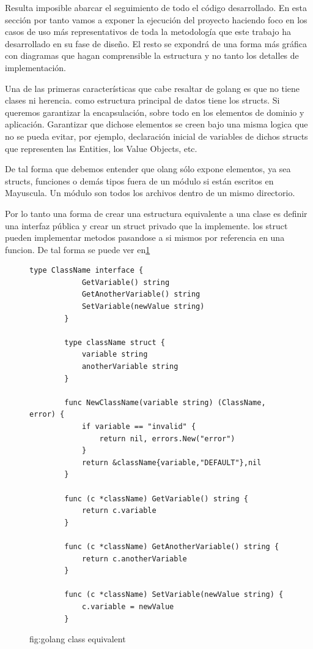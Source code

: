 Resulta imposible abarcar el seguimiento de todo el código desarrollado. En esta sección por tanto vamos a exponer la ejecución del proyecto haciendo foco en los casos de uso más representativos de toda la metodología que este trabajo ha desarrollado en su fase de diseño. El resto se expondrá de una forma más gráfica con diagramas que hagan comprensible la estructura y no tanto los detalles de implementación.

Una de las primeras características que cabe resaltar de golang es que no tiene clases ni herencia. como estructura
principal de datos tiene los structs. Si queremos garantizar la encapsulación, sobre todo en los elementos de dominio y aplicación. Garantizar que dichose elementos se creen bajo una misma logica que no se pueda evitar, por ejemplo, declaración inicial de variables de dichos structs que representen las Entities, los Value Objects, etc.

De tal forma que debemos entender que olang sólo expone elementos, ya sea structs, funciones o demás tipos fuera de un módulo si están escritos en Mayuscula. Un módulo son todos los archivos dentro de un mismo directorio.

Por lo tanto una forma de crear una estructura equivalente a una clase es definir una interfaz pública y crear un struct privado que la implemente. los struct pueden implementar metodos pasandose a si mismos por referencia en una funcion. De tal forma se puede ver en\ref{fig:golang class equivalent}

\begin{figure}[H]
    \centering
    \begin{lstlisting}[label={lst:lstlisting}]
        type ClassName interface {
            GetVariable() string
            GetAnotherVariable() string
            SetVariable(newValue string)
        }

        type className struct {
            variable string
            anotherVariable string
        }

        func NewClassName(variable string) (ClassName, error) {
            if variable == "invalid" {
                return nil, errors.New("error")
            }
            return &className{variable,"DEFAULT"},nil
        }

        func (c *className) GetVariable() string {
            return c.variable
        }

        func (c *className) GetAnotherVariable() string {
            return c.anotherVariable
        }

        func (c *className) SetVariable(newValue string) {
            c.variable = newValue
        }
    \end{lstlisting}
    \caption{fig:golang class equivalent}\label{fig:golang class equivalent}
\end{figure}

